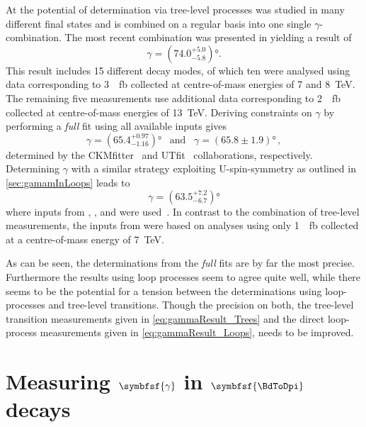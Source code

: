 At \lhcb the potential of determination via tree-level processes was studied in many different final states and is combined on a regular basis into one single $\gamma$-combination.
The most recent combination was presented in \cite{GammCombo} yielding a result of
\begin{equation}
\gamma=\left(74.0^{+5.0}_{-5.8}\right)\!\si{\degree}.\label{eq:gammaResult_Trees}
\end{equation}
This result includes \num{15} different decay modes, of which ten were analysed using data corresponding to \SI{3}{\per\femto\barn} collected at centre-of-mass energies of \num{7} and \SI{8}{\tera\electronvolt}.
The remaining five measurements use additional data corresponding to \SI{2}{\per\femto\barn} collected at centre-of-mass energies of \SI{13}{\tera\electronvolt}.
Deriving constraints on $\gamma$ by performing a \emph{full} fit using all available inputs gives
\begin{equation}
\gamma=\left(65.4^{+0.97}_{-1.16}\right)\!\si{\degree}\,\,\,\,\,\text{and}\,\,\,\,\,\gamma=\left(65.8\pm1.9\right)\!\si{\degree}\,,
\end{equation}
determined by the CKMfitter~\cite{CKMfitter2015} and UTfit~\cite{UTfit-UT} collaborations, respectively.
Determining $\gamma$ with a similar strategy exploiting U-spin-symmetry as outlined in \cref{sec:gamamInLoops} leads to
\begin{equation}
\gamma=\left(63.5^{+7.2}_{-6.7}\right)\!\si{\degree}\label{eq:gammaResult_Loops}
\end{equation}
where inputs from \babar, \belle, \cdf and \lhcb were used~\cite{Aaij:2014xba}. In contrast to the combination of tree-level measurements, the inputs from \lhcb were based on analyses using only \SI{1}{\per\femto\barn} collected at a centre-of-mass energy of \SI{7}{\tera\electronvolt}.

As can be seen, the determinations from the \emph{full} fits are by far the most precise.
Furthermore the results using loop processes seem to agree quite well, while there seems to be the potential for a tension between the determinations using loop-processes and tree-level transitions.
Though the precision on both, the tree-level transition measurements given in \cref{eq:gammaResult_Trees} and the direct loop-process measurements given in \cref{eq:gammaResult_Loops}, needs to be improved.

\section[head={Measuring $\gamma$ in $\BdToDpi$ decays},tocentry={Measuring $\gamma$ in $\BdToDpi$ decays}]{Measuring $\symbfsf{\gamma}$ in $\symbfsf{\BdToDpi} $ decays}
\label{sec:GammaInBd2Dpi}

